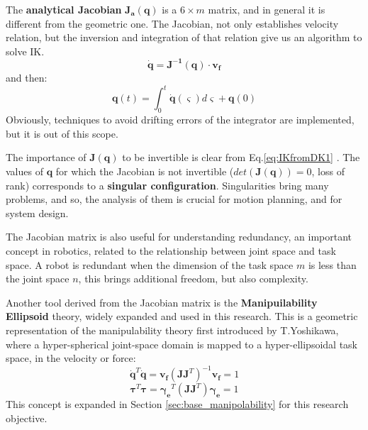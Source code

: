 The \textbf{analytical Jacobian} $\mathbf{J_a(\mathbf{q})}$ is a $6\times m$ matrix, and in general it is different from the geometric one. 
The Jacobian, not only establishes velocity relation, but the inversion and integration of that relation give us an algorithm to solve IK. 
\begin{equation}
\label{eq:IKfromDK1}
    \mathbf{\dot{q}} = \mathbf{J^{-1}(\mathbf{q})}\cdot    \mathbf{v_f}  
\end{equation}
and then: 
\begin{equation}
\label{eq:IKfromDK2}
    \mathbf{q}(t) = \int_0^t{\mathbf{\dot{q}}(\varsigma)d\varsigma} + \mathbf{q}(0)  
\end{equation}
Obviously, techniques to avoid drifting errors of the integrator are implemented, but it is out of this scope. 

The importance of $ \mathbf{J(\mathbf{q})}$ to be invertible is clear from Eq.\ref{eq:IKfromDK1} . The values of $\mathbf{q}$ for which the Jacobian is not invertible ($det(\mathbf{J(\mathbf{q})}) = 0$, loss of rank) corresponds to a \textbf{singular configuration}. Singularities bring many problems, and so, the analysis of them is crucial for motion planning, and for system design.

The Jacobian matrix is also useful for understanding redundancy, an important concept in robotics, related to the relationship between joint space and task space\cite{Siciliano}\cite{RoboticMechanics}\cite{YoshikawaRedundancy}. A robot is redundant when the dimension of the task space $m$ is less than the joint space $n$, this brings additional freedom, but also complexity. 

Another tool derived from the Jacobian matrix is the \textbf{Manipuilability Ellipsoid} theory, widely expanded and used in this research. This is a geometric representation of the manipulability theory first introduced by T.Yoshikawa\cite{ManipulabilityYoshikawa}, where a hyper-spherical joint-space domain is mapped to a hyper-ellipsoidal task space, in the velocity or force: 
\begin{equation}
\label{eq:EllipsoidVel}
    \mathbf{\dot{q}}^T \mathbf{\dot{q}} = \mathbf{v_f}(\mathbf{J}\mathbf{J}^T)^{-1}\mathbf{v_f} = 1
\end{equation}
\begin{equation}
\label{eq:EllipsoidForce}
    \mathbf{\tau}^T \mathbf{\tau} = \mathbf{\gamma_e}^T(\mathbf{J}\mathbf{J}^T)\mathbf{\gamma_e} = 1
\end{equation}
This concept is expanded in Section \ref{sec:base_manipolability} for this research objective.

